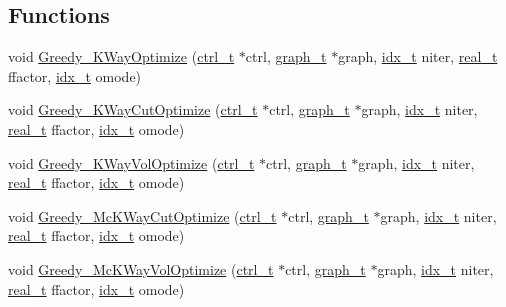 \subsection*{Functions}
\begin{DoxyCompactItemize}
\item 
void \hyperlink{a00221_a063b67f1b75662342f8db5aefba11cc5}{Greedy\+\_\+\+K\+Way\+Optimize} (\hyperlink{a00742}{ctrl\+\_\+t} $\ast$ctrl, \hyperlink{a00734}{graph\+\_\+t} $\ast$graph, \hyperlink{a00876_aaa5262be3e700770163401acb0150f52}{idx\+\_\+t} niter, \hyperlink{a00876_a1924a4f6907cc3833213aba1f07fcbe9}{real\+\_\+t} ffactor, \hyperlink{a00876_aaa5262be3e700770163401acb0150f52}{idx\+\_\+t} omode)
\item 
void \hyperlink{a00221_aaa70dea85e3a1149132362c93099d543}{Greedy\+\_\+\+K\+Way\+Cut\+Optimize} (\hyperlink{a00742}{ctrl\+\_\+t} $\ast$ctrl, \hyperlink{a00734}{graph\+\_\+t} $\ast$graph, \hyperlink{a00876_aaa5262be3e700770163401acb0150f52}{idx\+\_\+t} niter, \hyperlink{a00876_a1924a4f6907cc3833213aba1f07fcbe9}{real\+\_\+t} ffactor, \hyperlink{a00876_aaa5262be3e700770163401acb0150f52}{idx\+\_\+t} omode)
\item 
void \hyperlink{a00221_af249da13cad4e148e2a6efcacad5d5da}{Greedy\+\_\+\+K\+Way\+Vol\+Optimize} (\hyperlink{a00742}{ctrl\+\_\+t} $\ast$ctrl, \hyperlink{a00734}{graph\+\_\+t} $\ast$graph, \hyperlink{a00876_aaa5262be3e700770163401acb0150f52}{idx\+\_\+t} niter, \hyperlink{a00876_a1924a4f6907cc3833213aba1f07fcbe9}{real\+\_\+t} ffactor, \hyperlink{a00876_aaa5262be3e700770163401acb0150f52}{idx\+\_\+t} omode)
\item 
void \hyperlink{a00221_a68223b074be60fa4ac030e3c52071410}{Greedy\+\_\+\+Mc\+K\+Way\+Cut\+Optimize} (\hyperlink{a00742}{ctrl\+\_\+t} $\ast$ctrl, \hyperlink{a00734}{graph\+\_\+t} $\ast$graph, \hyperlink{a00876_aaa5262be3e700770163401acb0150f52}{idx\+\_\+t} niter, \hyperlink{a00876_a1924a4f6907cc3833213aba1f07fcbe9}{real\+\_\+t} ffactor, \hyperlink{a00876_aaa5262be3e700770163401acb0150f52}{idx\+\_\+t} omode)
\item 
void \hyperlink{a00221_a4177983ff9528ecb665a71f0ab1785e9}{Greedy\+\_\+\+Mc\+K\+Way\+Vol\+Optimize} (\hyperlink{a00742}{ctrl\+\_\+t} $\ast$ctrl, \hyperlink{a00734}{graph\+\_\+t} $\ast$graph, \hyperlink{a00876_aaa5262be3e700770163401acb0150f52}{idx\+\_\+t} niter, \hyperlink{a00876_a1924a4f6907cc3833213aba1f07fcbe9}{real\+\_\+t} ffactor, \hyperlink{a00876_aaa5262be3e700770163401acb0150f52}{idx\+\_\+t} omode)
\item 

\end{DoxyCompactItemize}

